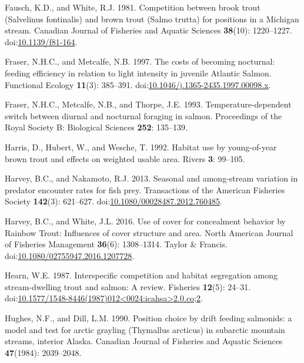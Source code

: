 \documentclass[]{article}
\begin{document}
\hypertarget{ref-FauschWhite1981}{}
Fausch, K.D., and White, R.J. 1981. Competition between brook trout
(Salvelinus fontinalis) and brown trout (Salmo trutta) for positions in
a Michigan stream. Canadian Journal of Fisheries and Aquatic Sciences
\textbf{38}(10): 1220--1227.
doi:\href{https://doi.org/10.1139/f81-164}{10.1139/f81-164}.

\hypertarget{ref-Fraser1997}{}
Fraser, N.H.C., and Metcalfe, N.B. 1997. The costs of becoming
nocturnal: feeding efficiency in relation to light intensity in juvenile
Atlantic Salmon. Functional Ecology \textbf{11}(3): 385--391.
doi:\href{https://doi.org/10.1046/j.1365-2435.1997.00098.x}{10.1046/j.1365-2435.1997.00098.x}.

\hypertarget{ref-Fraser1993}{}
Fraser, N.H.C., Metcalfe, N.B., and Thorpe, J.E. 1993.
Temperature-dependent switch between diurnal and nocturnal foraging in
salmon. Proceedings of the Royal Society B: Biological Sciences
\textbf{252}: 135--139.

\hypertarget{ref-Harris1992}{}
Harris, D., Hubert, W., and Wesche, T. 1992. Habitat use by
young-of-year brown trout and effects on weighted usable area. Rivers
\textbf{3}: 99--105.

\hypertarget{ref-Harvey2013}{}
Harvey, B.C., and Nakamoto, R.J. 2013. Seasonal and among-stream
variation in predator encounter rates for fish prey. Transactions of the
American Fisheries Society \textbf{142}(3): 621--627.
doi:\href{https://doi.org/10.1080/00028487.2012.760485}{10.1080/00028487.2012.760485}.

\hypertarget{ref-Harvey2016}{}
Harvey, B.C., and White, J.L. 2016. Use of cover for concealment
behavior by Rainbow Trout: Influences of cover structure and area. North
American Journal of Fisheries Management \textbf{36}(6): 1308--1314.
Taylor \& Francis.
doi:\href{https://doi.org/10.1080/02755947.2016.1207728}{10.1080/02755947.2016.1207728}.

\hypertarget{ref-Hearn1987}{}
Hearn, W.E. 1987. Interspecific competition and habitat segregation
among stream-dwelling trout and salmon: A review. Fisheries
\textbf{12}(5): 24--31.
doi:\href{https://doi.org/10.1577/1548-8446(1987)012\%3C0024:icahsa\%3E2.0.co;2}{10.1577/1548-8446(1987)012\textless{}0024:icahsa\textgreater{}2.0.co;2}.

\hypertarget{ref-Hughes1990b}{}
Hughes, N.F., and Dill, L.M. 1990. Position choice by drift feeding
salmonids: a model and test for arctic grayling (Thymallus arcticus) in
subarctic mountain streams, interior Alaska. Canadian Journal of
Fisheries and Aquatic Sciences \textbf{47}(1984): 2039--2048.
\end{document}
